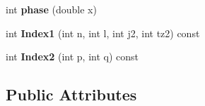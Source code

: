 \begin{DoxyCompactItemize}
\item 
\hypertarget{classModelSpace_a07d1c8f00131cc6c192d440e6be329f3}{int {\bfseries phase} (double x)}\label{classModelSpace_a07d1c8f00131cc6c192d440e6be329f3}

\item 
\hypertarget{classModelSpace_ab9e4a36b032abc3fcd81da8b2a8707d2}{int {\bfseries Index1} (int n, int l, int j2, int tz2) const }\label{classModelSpace_ab9e4a36b032abc3fcd81da8b2a8707d2}

\item 
\hypertarget{classModelSpace_acb31fdcb54a8fe3168378969176f0157}{int {\bfseries Index2} (int p, int q) const }\label{classModelSpace_acb31fdcb54a8fe3168378969176f0157}

\end{DoxyCompactItemize}
\subsection*{Public Attributes}
